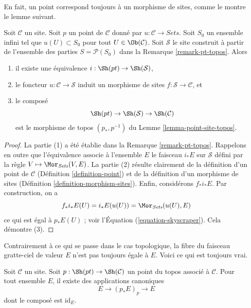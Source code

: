 \noindent
En fait, un point correspond toujours à un morphisme de sites, comme le montre
le lemme suivant.

\begin{lemma}
\label{lemma-site-point-morphism}
Soit $\mathcal{C}$ un site. Soit $p$ un point de $\mathcal{C}$ donné par
$u : \mathcal{C} \to \textit{Sets}$. Soit $S_0$ un ensemble infini tel que
$u(U) \subset S_0$ pour tout $U \in \Ob(\mathcal{C})$. Soit $\mathcal{S}$ le
site construit à partir de l’ensemble des parties
$S = \mathcal{P}(S_0)$ dans la Remarque \ref{remark-pt-topos}.
Alors
\begin{enumerate}
\item il existe une équivalence $i : \Sh(pt) \to \Sh(\mathcal{S})$,
\item le foncteur $u : \mathcal{C} \to \mathcal{S}$ induit un morphisme de
sites $f : \mathcal{S} \to \mathcal{C}$, et
\item le composé
$$
\Sh(pt) \to
\Sh(\mathcal{S}) \to
\Sh(\mathcal{C})
$$
est le morphisme de topos $(p_*, p^{-1})$ du
Lemme \ref{lemma-point-site-topos}.
\end{enumerate}
\end{lemma}

\begin{proof}
La partie (1) a été établie dans la Remarque \ref{remark-pt-topos}.
Rappelons en outre que l’équivalence associe à l’ensemble $E$ le faisceau
$i_*E$ sur $\mathcal{S}$ défini par la règle
$V \mapsto \Mor_{\textit{Sets}}(V, E)$.
La partie (2) résulte clairement de la définition d’un point de $\mathcal{C}$
(Définition \ref{definition-point}) et de la définition d’un morphisme de
sites (Définition \ref{definition-morphism-sites}).
Enfin, considérons $f_*i_*E$. Par construction, on a
$$
f_*i_*E(U) = i_*E(u(U)) = \Mor_{\textit{Sets}}(u(U), E)
$$
ce qui est égal à $p_*E(U)$ ; voir
l’Équation (\ref{equation-skyscraper}).
Cela démontre (3).
\end{proof}

\noindent
Contrairement à ce qui se passe dans le cas topologique, la fibre du faisceau
gratte-ciel de valeur $E$ n’est pas toujours égale à $E$. Voici ce qui est
toujours vrai.

\begin{lemma}
\label{lemma-stalk-skyscraper}
Soit $\mathcal{C}$ un site. Soit
$p : \Sh(pt) \to \Sh(\mathcal{C})$ un point du topos associé à
$\mathcal{C}$. Pour tout ensemble $E$, il existe des applications canoniques
$$
E \longrightarrow (p_*E)_p \longrightarrow E
$$
dont le composé est $\text{id}_E$.
\end{lemma}

